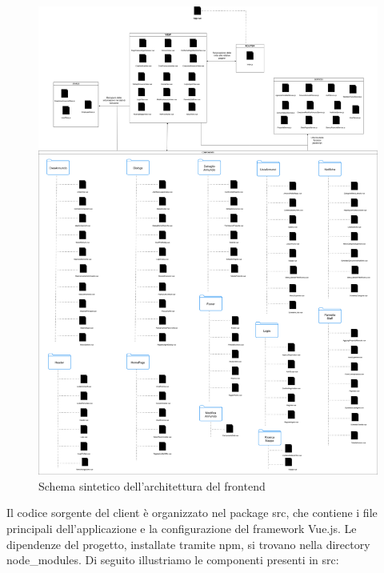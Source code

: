 \begin{figure}[H]
	\centering
	\includegraphics[width=1\linewidth]{Immagini/Schema frontend.png}
	\caption[Schema frontend]{Schema sintetico dell'architettura del frontend}
\end{figure}

Il codice sorgente del client è organizzato nel package src, che contiene i file principali dell’applicazione
e la configurazione del framework Vue.js. Le dipendenze del progetto, installate tramite npm, si trovano nella directory node\_modules. Di seguito illustriamo le componenti presenti in src:

